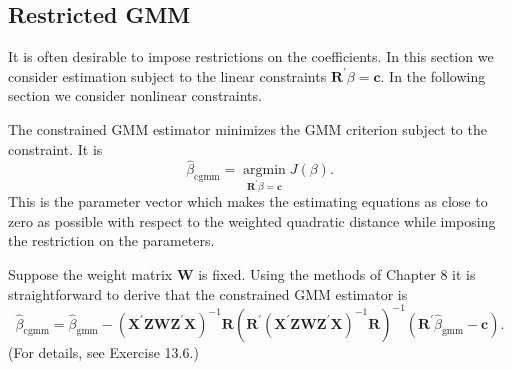 \documentclass[10pt]{article}
\begin{document}
\subsection{Restricted GMM}
It is often desirable to impose restrictions on the coefficients. In this section we consider estimation subject to the linear constraints $\boldsymbol{R}^{\prime} \beta=\boldsymbol{c}$. In the following section we consider nonlinear constraints.

The constrained GMM estimator minimizes the GMM criterion subject to the constraint. It is
$$
\widehat{\beta}_{\mathrm{cgmm}}=\underset{\boldsymbol{R}^{\prime} \beta=\boldsymbol{c}}{\operatorname{argmin}} J(\beta) .
$$
This is the parameter vector which makes the estimating equations as close to zero as possible with respect to the weighted quadratic distance while imposing the restriction on the parameters.

Suppose the weight matrix $\boldsymbol{W}$ is fixed. Using the methods of Chapter 8 it is straightforward to derive that the constrained GMM estimator is
$$
\widehat{\beta}_{\mathrm{cgmm}}=\widehat{\beta}_{\mathrm{gmm}}-\left(\boldsymbol{X}^{\prime} \boldsymbol{Z} \boldsymbol{W} \boldsymbol{Z}^{\prime} \boldsymbol{X}\right)^{-1} \boldsymbol{R}\left(\boldsymbol{R}^{\prime}\left(\boldsymbol{X}^{\prime} \boldsymbol{Z} \boldsymbol{W} \boldsymbol{Z}^{\prime} \boldsymbol{X}\right)^{-1} \boldsymbol{R}\right)^{-1}\left(\boldsymbol{R}^{\prime} \widehat{\beta}_{\mathrm{gmm}}-\boldsymbol{c}\right) .
$$
(For details, see Exercise 13.6.)
\end{document}
